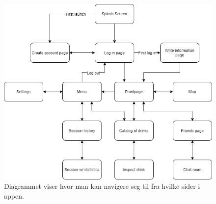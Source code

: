 \begin{figure}[H]
    \centering
    \includegraphics[scale=0.5]{images/lille_promille_float_diagram.drawio.png}
    \caption{Diagrammet viser hvor man kan navigere seg til fra hvilke sider i appen.}
\end{figure}

